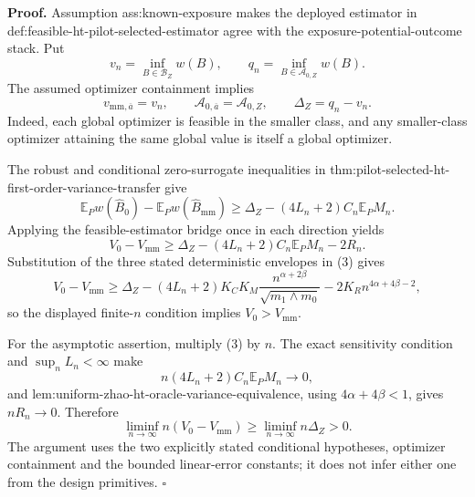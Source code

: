 \textbf{Proof.}
Assumption ass:known-exposure makes the deployed estimator in def:feasible-ht-pilot-selected-estimator agree with the exposure-potential-outcome stack.  Put
\[
v_n=\inf_{B\in\mathcal B_Z}w(B),
\qquad
q_n=\inf_{B\in\mathcal A_{0,Z}}w(B).
\]
The assumed optimizer containment implies
\[
v_{\mathrm{mm},\overline a}=v_n,
\qquad
\mathcal A_{0,\overline a}=\mathcal A_{0,Z},
\qquad
\Delta_Z=q_n-v_n.
\tag{1}
\]
Indeed, each global optimizer is feasible in the smaller class, and any smaller-class optimizer attaining the same global value is itself a global optimizer.

The robust and conditional zero-surrogate inequalities in thm:pilot-selected-ht-first-order-variance-transfer give
\[
\mathbb E_Pw(\widehat B_0)-\mathbb E_Pw(\widehat B_{\mathrm{mm}})
\ge\Delta_Z-(4L_n+2)C_n\mathbb E_PM_n.
\tag{2}
\]
Applying the feasible-estimator bridge once in each direction yields
\[
V_0-V_{\mathrm{mm}}
\ge\Delta_Z-(4L_n+2)C_n\mathbb E_PM_n-2R_n.
\tag{3}
\]
Substitution of the three stated deterministic envelopes in (3) gives
\[
V_0-V_{\mathrm{mm}}
\ge \Delta_Z
-(4L_n+2)K_CK_M\frac{n^{\alpha+2\beta}}{\sqrt{m_1\wedge m_0}}
-2K_Rn^{4\alpha+4\beta-2},
\]
so the displayed finite-\(n\) condition implies \(V_0>V_{\mathrm{mm}}\).

For the asymptotic assertion, multiply (3) by \(n\).  The exact sensitivity condition and \(\sup_nL_n<\infty\) make
\[
n(4L_n+2)C_n\mathbb E_PM_n\longrightarrow0,
\]
and lem:uniform-zhao-ht-oracle-variance-equivalence, using \(4\alpha+4\beta<1\), gives \(nR_n\to0\).  Therefore
\[
\liminf_{n\to\infty}n(V_0-V_{\mathrm{mm}})
\ge\liminf_{n\to\infty}n\Delta_Z>0.
\]
The argument uses the two explicitly stated conditional hypotheses, optimizer containment and the bounded linear-error constants; it does not infer either one from the design primitives.  \(\square\)